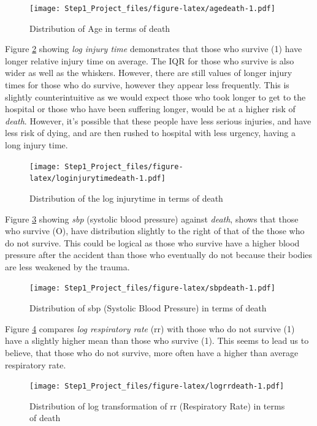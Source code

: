 \documentclass[
]{article}
\begin{document}
\begin{figure}
\centering
\texttt{[image: Step1\_Project\_files/figure-latex/agedeath-1.pdf]}
\caption{Distribution of Age in terms of death\label{fig:agedeath}}
\end{figure}

Figure \ref{fig:loginjurytimedeath} showing \emph{log injury time}
demonstrates that those who survive (1) have longer relative injury time
on average. The IQR for those who survive is also wider as well as the
whiskers. However, there are still values of longer injury times for
those who do survive, however they appear less frequently. This is
slightly counterintuitive as we would expect those who took longer to
get to the hospital or those who have been suffering longer, would be at
a higher risk of \emph{death}. However, it's possible that these people
have less serious injuries, and have less risk of dying, and are then
rushed to hospital with less urgency, having a long injury time.

\begin{figure}
\centering
\texttt{[image: Step1\_Project\_files/figure-latex/loginjurytimedeath-1.pdf]}
\caption{Distribution of the log injurytime in terms of
death\label{fig:loginjurytimedeath}}
\end{figure}

Figure \ref{fig:sbpdeath} showing \emph{sbp} (systolic blood pressure)
against \emph{death}, shows that those who survive (O), have
distribution slightly to the right of that of the those who do not
survive. This could be logical as those who survive have a higher blood
pressure after the accident than those who eventually do not because
their bodies are less weakened by the trauma.

\begin{figure}
\centering
\texttt{[image: Step1\_Project\_files/figure-latex/sbpdeath-1.pdf]}
\caption{Distribution of sbp (Systolic Blood Pressure) in terms of
death\label{fig:sbpdeath}}
\end{figure}

\newpage

Figure \ref{fig:logrrdeath} compares \emph{log respiratory rate} (rr)
with those who do not survive (1) have a slightly higher mean than those
who survive (1). This seems to lead us to believe, that those who do not
survive, more often have a higher than average respiratory rate.

\begin{figure}
\centering
\texttt{[image: Step1\_Project\_files/figure-latex/logrrdeath-1.pdf]}
\caption{Distribution of log transformation of rr (Respiratory Rate) in
terms of death\label{fig:logrrdeath}}
\end{figure}
\end{document}
